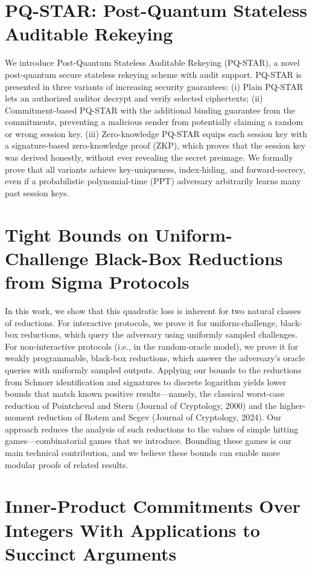 \documentclass[11pt,oneside]{book}
\theoremstyle{definition}
\theoremstyle{remark}
\theoremstyle{plain}
\begin{document}
\section{\cite{cryptoeprint:2025/1489} PQ-STAR: Post-Quantum Stateless Auditable Rekeying} 
We introduce Post-Quantum Stateless Auditable Rekeying (PQ-STAR), a novel post-quantum secure stateless rekeying scheme with audit support. PQ-STAR is presented in three variants of increasing security guarantees: (i) Plain PQ-STAR lets an authorized auditor decrypt and verify selected ciphertexts; (ii) Commitment-based PQ-STAR with the additional binding guarantee from the commitments, preventing a malicious sender from potentially claiming a random or wrong session key. (iii) Zero-knowledge PQ-STAR equips each session key with a signature-based zero-knowledge proof (ZKP), which proves that the session key was derived honestly, without ever revealing the secret preimage. We formally prove that all variants achieve key-uniqueness, index-hiding, and forward-secrecy, even if a probabilistic polynomial-time (PPT) adversary arbitrarily learns many past session keys.

\section{\cite{cryptoeprint:2025/1535} Tight Bounds on Uniform-Challenge Black-Box Reductions from Sigma Protocols}

In this work, we show that this quadratic loss is inherent for two natural classes of reductions. For interactive protocols, we prove it for uniform-challenge, black-box reductions, which query the adversary using uniformly sampled challenges. For non-interactive protocols (i.e., in the random-oracle model), we prove it for weakly programmable, black-box reductions, which answer the adversary’s oracle queries with uniformly sampled outputs. Applying our bounds to the reductions from Schnorr identification and signatures to discrete logarithm yields lower bounds that match known positive results—namely, the classical worst-case reduction of Pointcheval and Stern (Journal of Cryptology, 2000) and the higher-moment reduction of Rotem and Segev (Journal of Cryptology, 2024).
Our approach reduces the analysis of such reductions to the values of simple hitting games—combinatorial games that we introduce. Bounding these games is our main technical contribution, and we believe these bounds can enable more modular proofs of related results.


\section{\cite{cryptoeprint:2025/1536} Inner-Product Commitments Over Integers With Applications to Succinct Arguments}
\end{document}
